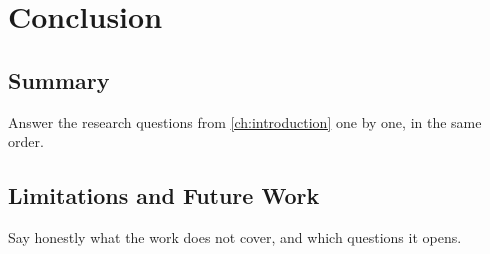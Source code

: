 \chapter{Conclusion}\label{ch:conclusion}

\section{Summary}
Answer the research questions from \cref{ch:introduction} one by one, in the same order.

\section{Limitations and Future Work}
Say honestly what the work does not cover, and which questions it opens.
